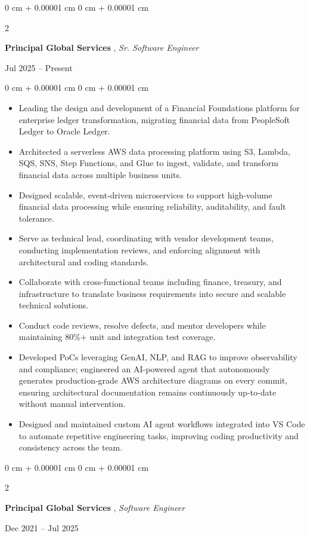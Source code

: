 \documentclass[10pt, letterpaper]{article}
\newenvironment{highlights}{
    \begin{itemize}[
        topsep=0.10 cm,
        parsep=0.10 cm,
        partopsep=0pt,
        itemsep=0pt,
        leftmargin=0 cm + 10pt
    ]
}{
    \end{itemize}
} %
\newenvironment{onecolentry}{
    \begin{adjustwidth}{
        0 cm + 0.00001 cm
    }{
        0 cm + 0.00001 cm
    }
}{
    \end{adjustwidth}
} %
\newenvironment{twocolentry}[2][]{
    \onecolentry
    \def\secondColumn{#2}
    \setcolumnwidth{\fill, 4.5 cm}
    \begin{paracol}{2}
}{
    \switchcolumn \raggedleft \secondColumn
    \end{paracol}
    \endonecolentry
} %
\begin{document}
        \begin{twocolentry}{
            Jul 2025 –  Present
        }
            \textbf{Principal Global Services }, \textit{Sr. Software Engineer}
             \vspace{0.10 cm}
            \end{twocolentry}

        \vspace{0.10 cm}
        \begin{onecolentry}
            \begin{highlights}

\item Leading the design and development of a Financial Foundations platform for enterprise ledger transformation, migrating financial data from PeopleSoft Ledger to Oracle Ledger.
\item Architected a serverless AWS data processing platform using S3, Lambda, SQS, SNS, Step Functions, and Glue to ingest, validate, and transform financial data across multiple business units.
\item Designed scalable, event-driven microservices to support high-volume financial data processing while ensuring reliability, auditability, and fault tolerance.
\item Serve as technical lead, coordinating with vendor development teams, conducting implementation reviews, and enforcing alignment with architectural and coding standards.
\item Collaborate with cross-functional teams including finance, treasury, and infrastructure to translate business requirements into secure and scalable technical solutions.
\item Conduct code reviews, resolve defects, and mentor developers while maintaining 80\%+ unit and integration test coverage.
\item Developed PoCs leveraging GenAI, NLP, and RAG to improve observability and compliance; engineered an AI-powered agent that autonomously generates production-grade AWS architecture diagrams on every commit, ensuring architectural documentation remains continuously up-to-date without manual intervention.
\item Designed and maintained custom AI agent workflows integrated into VS Code to automate repetitive engineering tasks, improving coding productivity and consistency across the team.
            \end{highlights}
        \end{onecolentry}
        \vspace{0.4 cm}
        \begin{twocolentry}{
            Dec 2021 –  Jul 2025
        }
            \textbf{Principal Global Services }, \textit{Software Engineer}
             \vspace{0.10 cm}
            \end{twocolentry}
\end{document}
